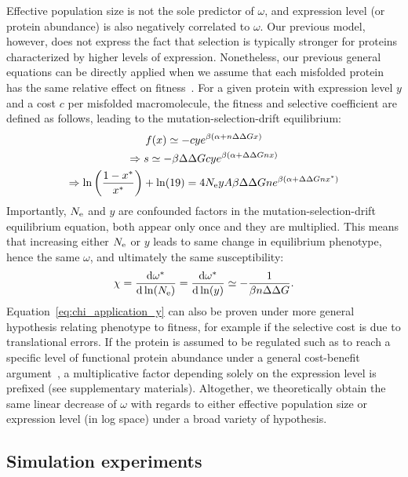 Effective population size is not the sole predictor of $\omega$, and expression level (or protein abundance) is also negatively correlated to $\omega$.
Our previous model, however, does not express the fact that selection is typically stronger for proteins characterized by higher levels of expression.
Nonetheless, our previous general equations can be directly applied when we assume that each misfolded protein has the same relative effect on fitness~\citep{Drummond2005a, Wilke2006, Drummond2008, Serohijos2012}.
For a given protein with expression level $y$ and a cost $c$ per misfolded macromolecule, the fitness and selective coefficient are defined as follows, leading to the mutation-selection-drift equilibrium:
\begin{gather}
    f (x) \simeq - c y e^{\beta (\alpha + n \Delta \Delta G x)} \\
    \Rightarrow s \simeq - \beta \Delta \Delta G c y e^{\beta(\alpha + \Delta \Delta G n x)} \\
    \Rightarrow \ln \left( \frac{1 - x^{*}}{x^{*}} \right) + \ln (19) = 4N_{\mathrm{e}} y A \beta \Delta \Delta G n e^{\beta(\alpha + \Delta \Delta G n x^{*})}
\end{gather}
Importantly, $N_{\mathrm{e}}$ and $y$ are confounded factors in the mutation-selection-drift equilibrium equation, both appear only once and they are multiplied.
This means that increasing either $N_{\mathrm{e}}$ or $y$ leads to same change in equilibrium phenotype, hence the same $\omega$, and ultimately the same susceptibility:
\begin{align}
    \chi = \frac{ \der \omega\eq}{\der \ln (\Ne)} = \frac{ \der \omega\eq}{\der \ln (y)} \simeq - \frac{1}{\beta \NbrSites \DeltaDeltaG}. \label{eq:chi_application_y}
\end{align}
Equation~\ref{eq:chi_application_y} can also be proven under more general hypothesis relating phenotype to fitness, for example if the selective cost is due to translational errors.
If the protein is assumed to be regulated such as to reach a specific level of functional protein abundance under a general cost-benefit argument~\citep{Cherry2010,Gout2010}, a multiplicative factor depending solely on the expression level is prefixed (see supplementary materials).
Altogether, we theoretically obtain the same linear decrease of $\omega$ with regards to either effective population size or expression level (in log space) under a broad variety of hypothesis.

\subsection{Simulation experiments}

